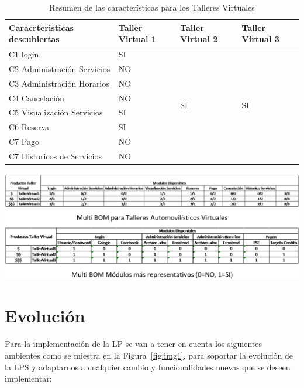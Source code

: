 \documentclass[10pt,a4paper,openany]{book}
\begin{document}
\begin{table}[htbp]
\centering
\begin{tabular}{|p{5cm}|p{3cm}|p{3cm}|p{3cm}|} \hline
Caracrteristicas descubiertas & Taller Virtual 1 & Taller Virtual 2 & Taller Virtual 3 \\ \hline
            C1 login                    & SI & \multirow{8}{3cm}{SI} & \multirow{8}{3cm}{SI}  \\
\cline{0-1} C2 Administración Servicios & NO & & \\
\cline{0-1} C3 Administración Horarios  & NO & & \\
\cline{0-1} C4 Cancelación              & NO & & \\
\cline{0-1} C5 Visualización Servicios  & SI & & \\
\cline{0-1} C6 Reserva                  & SI & & \\
\cline{0-1} C7 Pago                     & NO & & \\
\cline{0-1} C7 Historicos de Servicios  & NO & & \\\hline
\end{tabular}
\caption{Resumen de las características para los Talleres Virtuales }
\label{table:t9}
\end{table}

\includegraphics[width=1\textwidth]{t10}

\section{Evolución}

Para la implementación de la LP se van a tener en cuenta los siguientes ambientes como se miestra en la Figura~\ref{fig:img1}, para soportar la evolución de la LPS y adaptarnos a cualquier cambio y funcionalidades nuevas que se deseen implementar:\\
\end{document}
